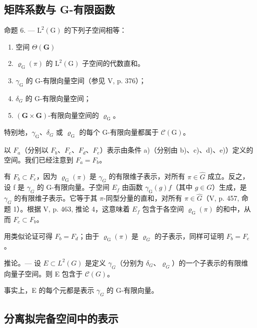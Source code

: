 \subsection{矩阵系数与 G-有限函数}

命题 6. --- \(\mathrm{L}^{2}(\mathrm{G})\) 的下列子空间相等：

\begin{enumerate}
\def\labelenumi{\alph{enumi})}
\item
  空间 \(\Theta (\mathbf{G})\)
\item
  \(\varrho_{\mathrm{G}}(\pi)\) 的 \(\mathrm{L}^2 (\mathrm{G})\) 子空间的代数直和。
\item
  \(\gamma_{\mathrm{G}}\) 的 G-有限向量空间（参见 V, p. 376）；
\item
  \(\delta_{G}\) 的 G-有限向量空间；
\item
  \((\mathbf{G} \times \mathbf{G})\)-有限向量空间的 \(\varrho_{\mathrm{G}}\)。
\end{enumerate}

特别地，\(\gamma_{\mathrm{G}}\)、\(\delta_{G}\) 或 \(\varrho_{\mathrm{G}}\) 的每个 G-有限向量都属于 \(\mathcal{C}(\mathrm{G})\)。

以 \(F_{a}\)（分别以 \(F_{b}\)、\(F_{c}\)、\(F_{d}\)、\(F_{e}\)）表示由条件 a)（分别由 b)、c)、d)、e)）定义的空间。我们已经注意到 \(F_{a} = F_{b}\)。

有 \(F_{b} \subset F_{c}\)，因为 \(\varrho_{\mathrm{G}}(\pi)\) 是 \(\gamma_{G}\) 的有限维子表示，对所有 \(\pi \in \widehat{G}\) 成立。反之，设 f 是 \(\gamma_{G}\) 的 G-有限向量。子空间 \(E_{f}\) 由函数 \(\gamma_{\mathrm{G}}(g)f\)（其中 \(g \in G\)）生成，是 \(\gamma_{G}\) 的有限维子表示。它等于其 \(\pi\)-同型分量的直和，对所有 \(\pi \in \widehat{G}\)（V, p. 457, 命题 1）。根据 V, p. 463, 推论 4，这意味着 \(E_{f}\) 包含于各空间 \(\varrho_{\mathrm{G}}(\pi)\) 的和中，从而 \(F_{c} \subset F_{b}\)。

用类似论证可得 \(F_{b} = F_{d}\)；由于 \(\varrho_{\mathrm{G}}(\pi)\) 是 \(\varrho_{G}\) 的子表示，同样可证明 \(F_{b} = F_{e}\)。

推论。--- 设 \(E \subset L^{2}(G)\) 是定义 \(\gamma_{G}\)（分别为 \(\delta_{G}\)、\(\varrho_{G}\)）的一个子表示的有限维向量子空间。则 E 包含于 \(\mathcal{C}(G)\)。

事实上，E 的每个元都是表示 \(\gamma_{G}\) 的 G-有限向量。

\subsection{分离拟完备空间中的表示}

